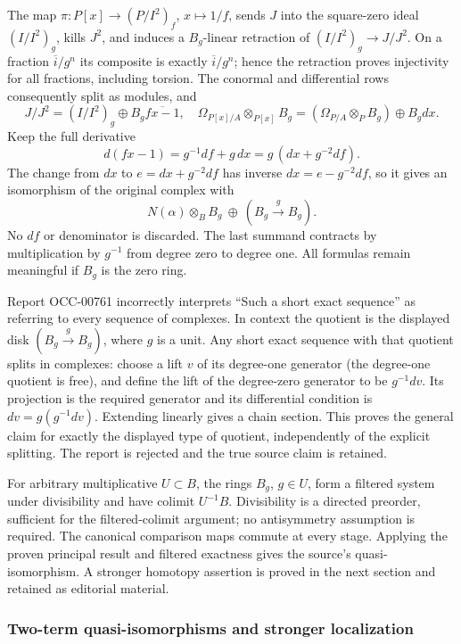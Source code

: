 The map \(\pi:P[x]\to(P/I^2)_f\), \(x\mapsto1/f\), sends \(J\) into the square-zero ideal \((I/I^2)_g\), kills \(J^2\), and induces a \(B_g\)-linear retraction of \((I/I^2)_g\to J/J^2\). On a fraction \(\overline i/g^n\) its composite is exactly \(\overline i/g^n\); hence the retraction proves injectivity for all fractions, including torsion. The conormal and differential rows consequently split as modules, and \[
J/J^2=(I/I^2)_g\oplus B_g\overline{fx-1},\quad
\Omega_{P[x]/A}\otimes_{P[x]}B_g
=(\Omega_{P/A}\otimes_P B_g)\oplus B_gdx.
\] Keep the full derivative \[
d(fx-1)=g^{-1}df+g\,dx=g\,(dx+g^{-2}df).
\] The change from \(dx\) to \(e=dx+g^{-2}df\) has inverse \(dx=e-g^{-2}df\), so it gives an isomorphism of the original complex with \[
N(\alpha)\otimes_B B_g\ \oplus\ (B_g\xrightarrow{g}B_g).
\] No \(df\) or denominator is discarded. The last summand contracts by multiplication by \(g^{-1}\) from degree zero to degree one. All formulas remain meaningful if \(B_g\) is the zero ring.

Report OCC-00761 incorrectly interprets ``Such a short exact sequence'' as referring to every sequence of complexes. In context the quotient is the displayed disk \((B_g\xrightarrow g B_g)\), where \(g\) is a unit. Any short exact sequence with that quotient splits in complexes: choose a lift \(v\) of its degree-one generator (the degree-one quotient is free), and define the lift of the degree-zero generator to be \(g^{-1}dv\). Its projection is the required generator and its differential condition is \(dv=g(g^{-1}dv)\). Extending linearly gives a chain section. This proves the general claim for exactly the displayed type of quotient, independently of the explicit splitting. The report is rejected and the true source claim is retained.

For arbitrary multiplicative \(U\subset B\), the rings \(B_g\), \(g\in U\), form a filtered system under divisibility and have colimit \(U^{-1}B\). Divisibility is a directed preorder, sufficient for the filtered-colimit argument; no antisymmetry assumption is required. The canonical comparison maps commute at every stage. Applying the proven principal result and filtered exactness gives the source's quasi-isomorphism. A stronger homotopy assertion is proved in the next section and retained as editorial material.

\subsubsection{Two-term quasi-isomorphisms and stronger localization}\label{algebra-proof-044-two-term-quasi-isomorphisms-and-stronger-localization}

